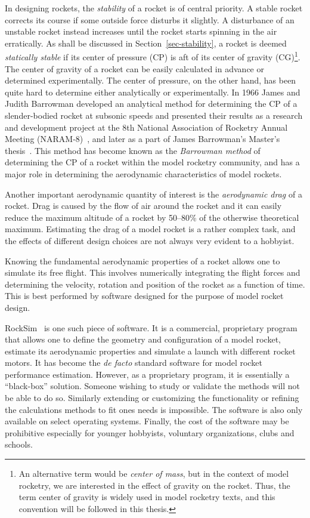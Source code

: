 In designing rockets, the {\it stability} of a rocket is of central
priority.  A stable rocket corrects its course if some outside
force disturbs it slightly.  A disturbance of an unstable rocket
instead  increases until the rocket starts spinning in the
air erratically.  As shall be discussed in
Section~\ref{sec-stability}, a rocket is deemed 
{\it statically stable} if its center of pressure (CP) is aft of its
center of gravity (CG)\footnote{An alternative term would be 
  {\it center of mass}, but in the context of model rocketry, we are
  interested in the effect of gravity on the rocket.  Thus, the term
  center of gravity is widely used in model rocketry texts, and this
  convention will be followed in this thesis.}.
The center of gravity of a rocket can be easily calculated in advance
or determined experimentally.  The center of pressure, on the other
hand, has been quite hard to determine either analytically or
experimentally.  In 1966 James and Judith Barrowman developed an
analytical method for determining the CP of a slender-bodied rocket at
subsonic speeds and presented their results as a research and
development project at the 8th National Association of Rocketry Annual
Meeting (NARAM-8)~\cite{barrowman-rd}, and later as a part of James
Barrowman's Master's thesis~\cite{barrowman-thesis}.  This method has
become known as the {\it Barrowman method} of determining the CP of a
rocket within the model rocketry community, and has a major role in
determining the aerodynamic characteristics of model rockets.

Another important aerodynamic quantity of interest is the 
{\it aerodynamic drag} of a rocket.  Drag is caused by the flow of air
around the rocket and it can easily reduce the maximum altitude of a
rocket by 50--80\% of the otherwise theoretical maximum.  Estimating
the drag of a model rocket is a rather complex task, and the effects
of different design choices are not always very evident to a
hobbyist.

Knowing the fundamental aerodynamic properties of a rocket allows one
to simulate its free flight.  This involves numerically integrating
the flight forces and determining the velocity, rotation and position
of the rocket as a function of time.  This is best performed by
software designed for the purpose of model rocket design.

RockSim~\cite{rocksim} is one such piece of software.  It is a
commercial, proprietary program that allows one to define the geometry
and configuration of a model rocket, estimate its aerodynamic
properties and simulate a launch with different rocket motors.  It has
become the {\it de facto} standard software for model rocket
performance estimation.  However, as a proprietary program, it is
essentially a ``black-box'' solution.  Someone wishing to study or
validate the methods will not be able to do so.  Similarly extending
or customizing the functionality or refining the calculations methods
to fit ones needs is impossible.  The software is also only available
on select operating systems.  Finally, the cost of the software may be
prohibitive especially for younger hobbyists, voluntary organizations,
clubs and schools.

